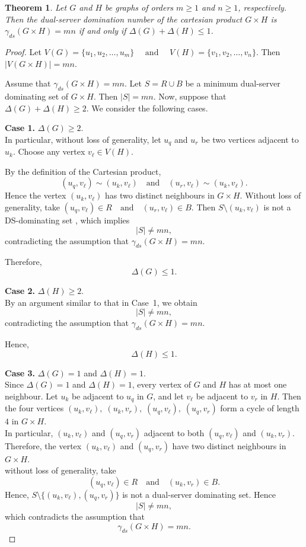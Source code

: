 \documentclass{article}
\newtheorem{theorem}{Theorem}[section]
\begin{document}
\begin{theorem}
Let $G$ and $H$ be graphs of orders $m\ge1$ and $n\ge1$, respectively. Then the dual-server domination number of the cartesian product  $G\times H $ is 
$\gamma_{ds}(G\times H)=mn$
if and only if $
\Delta(G)+\Delta(H)\le1$.
\end{theorem}

\begin{proof}
Let $
V(G)=\{u_1,u_2,\ldots,u_m\} \quad \text{ and }\quad
V(H)=\{v_1,v_2,\ldots,v_n\}$.
Then $
|V(G\times H)|=mn$.

Assume that $\gamma_{ds}(G\times H)=mn$. Let $S=R\cup B $
be a minimum dual-server dominating set of $G\times H$. Then $|S|=mn$. Now, suppose that  $\Delta(G)+\Delta(H)\ge2$.
We consider the following cases.

\textbf{Case 1.} $\Delta(G)\ge2$.\\
In particular, without loss of generality, let  $u_q$ and $u_r$ be two vertices adjacent to $u_k$. Choose any vertex $v_\ell\in V(H)$.

By the definition of the Cartesian product,
\[
(u_q,v_\ell)\sim(u_k,v_\ell)
\quad\text{and}\quad
(u_r,v_\ell)\sim(u_k,v_\ell).
\]
Hence the vertex $(u_k,v_\ell)$ has two distinct neighbours in
$G\times H$.
Without loss of generality, take
$
(u_q,v_\ell)\in R
\quad\text{and}\quad
(u_r,v_\ell)\in B.
$ Then $S \setminus (u_k,v_\ell) $  is not a DS-dominating set
, which implies
\[
|S| \neq mn,
\]
contradicting the assumption that $
\gamma_{ds}(G\times H)=mn $.

Therefore,
\[
\Delta(G)\le1.
\]

\textbf{Case 2.} $\Delta(H)\ge2$.\\
By an argument similar to that in Case~1, we obtain
\[
|S|\neq mn,
\]
contradicting the assumption that $
\gamma_{ds}(G\times H)=mn $.

Hence,
\[
\Delta(H)\le1.
\]

\textbf{Case 3.} $\Delta(G)=1$ and $\Delta(H)=1$.\\
Since $\Delta(G)=1$ and $\Delta(H)=1$, every vertex of $G$ and $H$ has at
most one neighbour.
Let $u_k$ be adjacent to $u_q$ in $G$, and let $v_\ell$ be adjacent to
$v_r$ in $H$. Then the four vertices $
(u_k,v_\ell),\;
(u_k,v_r),\;
(u_q,v_\ell),\;
(u_q,v_r)$
form a cycle of length $4$ in $G\times H$.\\
In particular, $(u_k,v_\ell)$ and $(u_q,v_r)$  adjacent to both
$(u_q,v_\ell)$ and $(u_k,v_r)$. Therefore, the vertex $(u_k,v_\ell)$  and $(u_q,v_r) $ have
two distinct neighbours in $G\times H$.\\
without loss of generality, take
\[
(u_q,v_\ell)\in R
\quad\text{and}\quad
(u_k,v_r)\in B.
\]
Hence, $
S\setminus\{(u_k,v_\ell),(u_q,v_r)\}
$ is not a dual-server dominating set. Hence 
\[
|S| \neq mn,
\]
which contradicts the assumption that
\[
\gamma_{ds}(G\times H)=mn.
\]


\end{proof}
\end{document}
